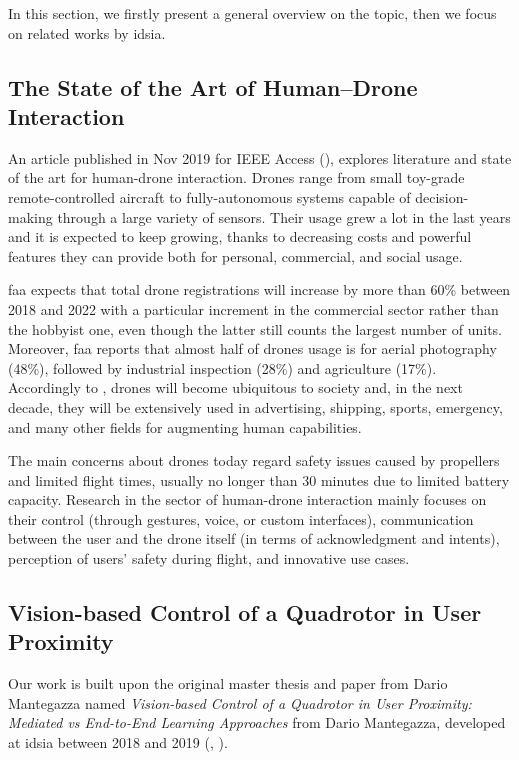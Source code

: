In this section, we firstly present a general overview on the topic, then we focus on related works by \gls{idsia}.



\subsection{The State of the Art of Human–Drone Interaction}
\label{subsec:human-drone-sota}

An article published in Nov 2019 for IEEE Access (\cite{human-drone-sota}), explores literature and state of the art for human-drone interaction. Drones range from small toy-grade remote-controlled aircraft to fully-autonomous systems capable of decision-making through a large variety of sensors. Their usage grew a lot in the last years and it is expected to keep growing, thanks to decreasing costs and powerful features they can provide both for personal, commercial, and social usage.

\gls{faa} expects that total drone registrations will increase by more than 60\% between 2018 and 2022 with a particular increment in the commercial sector rather than the hobbyist one, even though the latter still counts the largest number of units. Moreover, \gls{faa} reports that almost half of drones usage is for aerial photography (48\%), followed by industrial inspection (28\%) and agriculture (17\%). Accordingly to \cite{human-drone-sota}, drones will become ubiquitous to society and, in the next decade, they will be extensively used in advertising, shipping, sports, emergency, and many other fields for augmenting human capabilities.

The main concerns about drones today regard safety issues caused by propellers and limited flight times, usually no longer than 30 minutes due to limited battery capacity. Research in the sector of human-drone interaction mainly focuses on their control (through gestures, voice, or custom interfaces), communication between the user and the drone itself (in terms of acknowledgment and intents), perception of users' safety during flight, and innovative use cases. 



\subsection{Vision-based Control of a Quadrotor in User Proximity}
\label{subsec:sota-dario}

Our work is built upon the original master thesis and paper from Dario Mantegazza named \textit{Vision-based Control of a Quadrotor in User Proximity: Mediated vs End-to-End Learning Approaches} from Dario Mantegazza, developed at \gls{idsia} between 2018 and 2019 (\cite{mantegazza2018thesis}, \cite{mantegazza2019visionbased}).

